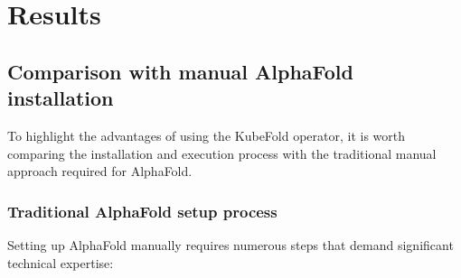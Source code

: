 \chapter{Results}
%
%


\section{Comparison with manual AlphaFold installation}

To highlight the advantages of using the KubeFold operator, it is worth comparing the installation and execution process with the traditional manual approach required for AlphaFold.

\subsection{Traditional AlphaFold setup process}

Setting up AlphaFold manually requires numerous steps that demand significant technical expertise:

